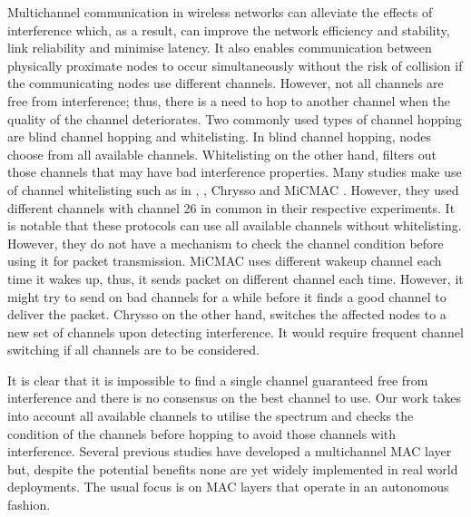 Multichannel communication in wireless networks can alleviate the effects of interference which, as a result, can improve the network efficiency and stability, link reliability and minimise latency. It also enables communication between physically proximate nodes to occur simultaneously without the risk of collision if the communicating nodes use different channels. However, not all channels are free from interference; thus, there is a need to hop to another channel when the quality of the channel deteriorates. Two commonly used types of channel hopping \cite{watteyne} are blind channel hopping and whitelisting. In blind channel hopping, nodes choose from all available channels. Whitelisting on the other hand, filters out those channels that may have bad interference properties. Many studies make use of channel whitelisting such as in \cite{watteyne}, \cite{wu}, Chrysso \cite{chrysso} and MiCMAC \cite{micmac}. However, they used different channels with channel 26 in common in their respective experiments. 
It is notable that these protocols can use all available channels without whitelisting. However, they do not have a mechanism to check the channel condition before using it for packet transmission. %
MiCMAC uses different wakeup channel each time it wakes up, thus, it sends packet on different channel each time. However, it might try to send on bad channels for a while before it finds a good channel to deliver the packet. Chrysso on the other hand, switches the affected nodes to a new set of channels upon detecting interference. It would require frequent channel switching if all channels are to be considered.

It is clear that it is impossible to find a single channel guaranteed free from interference and there is no consensus on the best channel to use. Our work takes into account all available channels to utilise the spectrum and checks the condition of the channels before hopping to avoid those channels with interference. Several previous studies have developed a multichannel MAC layer but, despite the potential benefits none are yet widely implemented in real world deployments. The usual focus is on MAC layers that operate in an autonomous fashion. 

